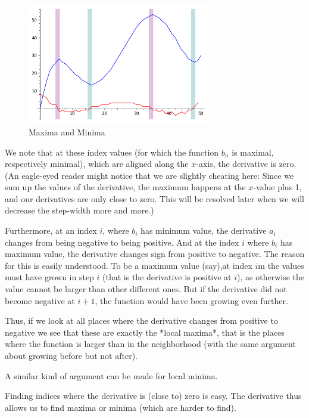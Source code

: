 \begin{figure}
\begin{center}
\includegraphics[width=8cm]{pic/pythder2.png}
\end{center}
\caption{Maxima and Minima}
\label{figpythder2}
\end{figure}

We note that at these index values (for which the function $b_n$ is maximal,
respectively minimal), which are aligned along the $x$-axis, the derivative
is zero. (An eagle-eyed reader might notice that we are slightly cheating
here: Since we sum up the values of the derivative, the maximum happens at
the $x$-value plus 1, and our derivatives are only close to zero. This will
be resolved later when we will decrease the step-width more and more.)

Furthermore, at an index $i$, where $b_i$ has minimum value, the derivative
$a_i$ changes from being negative to being positive. And at the index $i$
where $b_i$ has maximum value, the derivative changes sign from positive to
negative.  The reason for this is easily understood. To be a maximum value
(say),at index $i$m the values must have grown in step $i$ (that is the
derivative is positive at $i$), as otherwise the value cannot be larger than
other different ones. But if the derivative did not become negative at
$i+1$, the function would have been growing even further.

Thus, if we look at all places where the derivative changes from positive to
negative we see that these are exactly the *local maxima*, that is the
places where the function is larger than in the neighborhood (with the same
argument about growing before but not after).

A similar kind of argument can be made for local minima.

Finding indices where the derivative is (close to) zero is easy. The
derivative thus allows us to find maxima or minima (which are harder to
find).
\smallskip

